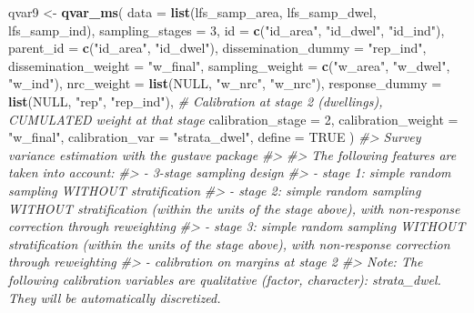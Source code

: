 \documentclass[
]{article}
\newenvironment{Shaded}{\begin{snugshade}}{\end{snugshade}}
\newcommand{\AttributeTok}[1]{\textcolor[rgb]{0.13,0.29,0.53}{#1}}
\newcommand{\CommentTok}[1]{\textcolor[rgb]{0.56,0.35,0.01}{\textit{#1}}}
\newcommand{\ConstantTok}[1]{\textcolor[rgb]{0.56,0.35,0.01}{#1}}
\newcommand{\DecValTok}[1]{\textcolor[rgb]{0.00,0.00,0.81}{#1}}
\newcommand{\FunctionTok}[1]{\textcolor[rgb]{0.13,0.29,0.53}{\textbf{#1}}}
\newcommand{\NormalTok}[1]{#1}
\newcommand{\OtherTok}[1]{\textcolor[rgb]{0.56,0.35,0.01}{#1}}
\newcommand{\StringTok}[1]{\textcolor[rgb]{0.31,0.60,0.02}{#1}}
\begin{document}
\begin{Shaded}
\begin{Highlighting}[]
\NormalTok{qvar9 }\OtherTok{\textless{}{-}} \FunctionTok{qvar\_ms}\NormalTok{(}
  \AttributeTok{data =} \FunctionTok{list}\NormalTok{(lfs\_samp\_area, lfs\_samp\_dwel, lfs\_samp\_ind),}
  \AttributeTok{sampling\_stages =} \DecValTok{3}\NormalTok{,}
  \AttributeTok{id =} \FunctionTok{c}\NormalTok{(}\StringTok{"id\_area"}\NormalTok{, }\StringTok{"id\_dwel"}\NormalTok{, }\StringTok{"id\_ind"}\NormalTok{),}
  \AttributeTok{parent\_id =} \FunctionTok{c}\NormalTok{(}\StringTok{"id\_area"}\NormalTok{, }\StringTok{"id\_dwel"}\NormalTok{),}
  \AttributeTok{dissemination\_dummy =} \StringTok{"rep\_ind"}\NormalTok{,}
  \AttributeTok{dissemination\_weight =} \StringTok{"w\_final"}\NormalTok{,}
  \AttributeTok{sampling\_weight =} \FunctionTok{c}\NormalTok{(}\StringTok{"w\_area"}\NormalTok{, }\StringTok{"w\_dwel"}\NormalTok{, }\StringTok{"w\_ind"}\NormalTok{),}
  \AttributeTok{nrc\_weight =} \FunctionTok{list}\NormalTok{(}\ConstantTok{NULL}\NormalTok{, }\StringTok{"w\_nrc"}\NormalTok{, }\StringTok{"w\_nrc"}\NormalTok{),}
  \AttributeTok{response\_dummy =} \FunctionTok{list}\NormalTok{(}\ConstantTok{NULL}\NormalTok{, }\StringTok{"rep"}\NormalTok{, }\StringTok{"rep\_ind"}\NormalTok{),}
  \CommentTok{\# Calibration at stage 2 (dwellings), CUMULATED weight at that stage}
  \AttributeTok{calibration\_stage =} \DecValTok{2}\NormalTok{,}
  \AttributeTok{calibration\_weight =} \StringTok{"w\_final"}\NormalTok{,}
  \AttributeTok{calibration\_var =} \StringTok{"strata\_dwel"}\NormalTok{,}
  \AttributeTok{define =} \ConstantTok{TRUE}
\NormalTok{)}
\CommentTok{\#\textgreater{} Survey variance estimation with the gustave package}
\CommentTok{\#\textgreater{} }
\CommentTok{\#\textgreater{} The following features are taken into account:}
\CommentTok{\#\textgreater{}   {-} 3{-}stage sampling design}
\CommentTok{\#\textgreater{}   {-} stage 1: simple random sampling WITHOUT stratification}
\CommentTok{\#\textgreater{}   {-} stage 2: simple random sampling WITHOUT stratification (within the units of the stage above), with non{-}response correction through reweighting}
\CommentTok{\#\textgreater{}   {-} stage 3: simple random sampling WITHOUT stratification (within the units of the stage above), with non{-}response correction through reweighting}
\CommentTok{\#\textgreater{}   {-} calibration on margins at stage 2}
\CommentTok{\#\textgreater{} Note: The following calibration variables are qualitative (factor, character): strata\_dwel. They will be automatically discretized.}

\end{Highlighting}
\end{Shaded}
\end{document}
